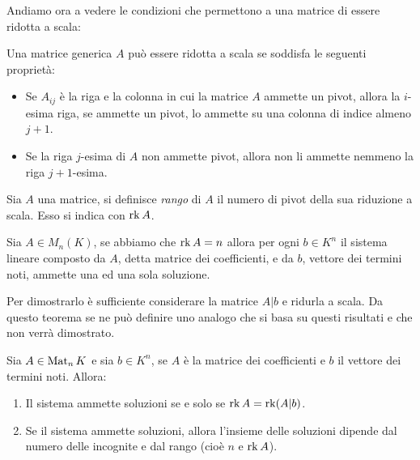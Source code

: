 Andiamo ora a vedere le condizioni che permettono a una matrice di essere ridotta a scala:
\begin{proprieta} \label{pr:pivot-riduzione-scala}
	Una matrice generica $A$ può essere ridotta a scala se soddisfa le seguenti proprietà:
	\begin{itemize}
		\item Se $A_{ij}$ è la riga e la colonna in cui la matrice $A$ ammette un pivot, allora la $i$-esima riga, se ammette un pivot, lo ammette su una colonna di indice almeno $j+1$.
		\item Se la riga $j$-esima di $A$ non ammette pivot, allora non li ammette nemmeno la riga $j+1$-esima.
	\end{itemize}
\end{proprieta}
\begin{definizione}
	Sia $A$ una matrice, si definisce \emph{rango} di $A$ il numero di pivot della sua riduzione a scala.
	Esso si indica con $\operatorname{rk} A$.
\end{definizione}
\begin{teorema}[di Cramer] \label{t:cramer}
	Sia $A\in M_n(K)$, se abbiamo che $\operatorname{rk} A = n$ allora per ogni $  b\in K^n$ il sistema lineare composto da $A$, detta matrice dei coefficienti, e da $b$, vettore dei termini noti, ammette una ed una sola soluzione.
\end{teorema}

Per dimostrarlo è sufficiente considerare la matrice $A |   b$ e ridurla a scala.
Da questo teorema se ne può definire uno analogo che si basa su questi risultati e che non verrà dimostrato.
\begin{teorema} \label{t:rouche-capelli}
	Sia $A\in\operatorname{Mat}_n{K}$ e sia $  b\in K^n$, se $A$ è la matrice dei coefficienti e $  b$ il vettore dei termini noti.
	Allora:
	\begin{enumerate}
		\item Il sistema ammette soluzioni se e solo se $\operatorname{rk} A = \operatorname{rk}( A |   b)$.
		\item Se il sistema ammette soluzioni, allora l'insieme delle soluzioni dipende dal numero delle incognite e dal rango (cioè $n$ e $\operatorname{rk} A$).
	\end{enumerate}
\end{teorema}

